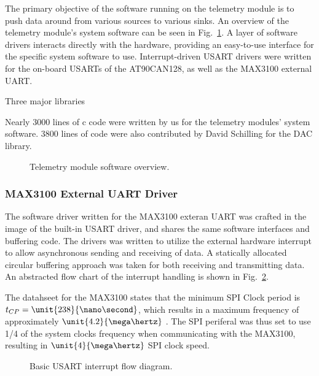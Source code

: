 The primary objective of the software running on the telemetry module is to push data around from various sources to various sinks. An overview of the telemetry module's system software can be seen in Fig.\ \ref{fig:telemetry_software_implementation}. A layer of software drivers interacts directly with the hardware, providing an easy-to-use interface for the specific system software to use. Interrupt-driven USART drivers were written for the on-board USARTs of the AT90CAN128, as well as the MAX3100 external UART.

Three major libraries 

Nearly 3000 lines of c code were written by us for the telemetry modules' system software. 3800 lines of code were also contributed by David Schilling for the DAC library.

\begin{figure}[H]
\centering

\caption{Telemetry module software overview.}
\label{fig:telemetry_software_implementation}
\end{figure}

\subsubsection{MAX3100 External UART Driver}

The software driver written for the MAX3100 exteran UART was crafted in the image of the built-in USART driver, and shares the same software interfaces and buffering code. The drivers was written to utilize the external hardware interrupt to allow asynchronous sending and receiving of data. A statically allocated circular buffering approach was taken for both receiving and transmitting data. An abstracted flow chart of the interrupt handling is shown in Fig.\ \ref{fig:usart_driver_flow}.

The datahseet for the MAX3100 states that the minimum SPI Clock period is $t_{CP}=\unit{238}{\nano\second}$, which results in a maximum frequency of approximately $\unit{4.2}{\mega\hertz}$ \cite{MAX3100}. The SPI periferal was thus set to use 1/4 of the system clocks frequency when communicating with the MAX3100, resulting in $\unit{4}{\mega\hertz}$ SPI clock speed.

\begin{figure}[H]
\centering

\caption{Basic USART interrupt flow diagram.}
\label{fig:usart_driver_flow}
\end{figure}

